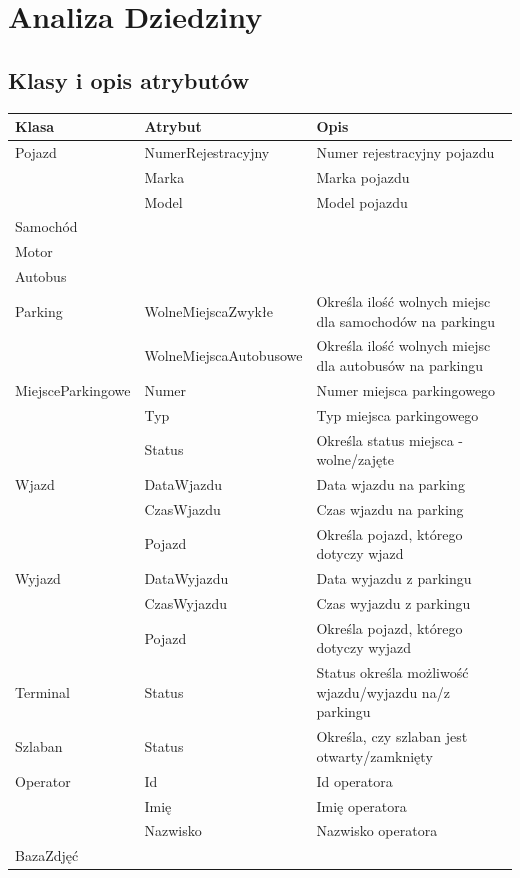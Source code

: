 \chapter{Analiza Dziedziny}
\label{cha:anDziedziny}

\section{Klasy i opis atrybutów}
\label{sec:klasyAtrybuty}
\begin{table}[H]
	\begin{tabular}{|l|l|l|} \hline
	\textbf{Klasa}	& \textbf{Atrybut} & \textbf{Opis} \\ \hline%
	Pojazd	& NumerRejestracyjny & Numer rejestracyjny pojazdu \\
	& Marka & Marka pojazdu \\
	& Model & Model pojazdu \\ \hline
	Samochód& & \\ \hline
	Motor& &  \\ \hline
	Autobus& & \\ \hline
	Parking	& WolneMiejscaZwykłe & Określa ilość wolnych miejsc dla samochodów na parkingu \\
	& WolneMiejscaAutobusowe & Określa ilość wolnych miejsc dla autobusów na parkingu \\ \hline
	MiejsceParkingowe	& Numer & Numer miejsca parkingowego \\
	& Typ & Typ miejsca parkingowego \\
	& Status & Określa status miejsca - wolne/zajęte \\ \hline
	Wjazd	& DataWjazdu & Data wjazdu na parking\\
	& CzasWjazdu & Czas wjazdu na parking \\
	& Pojazd & Określa pojazd, którego dotyczy wjazd \\ \hline
	Wyjazd	& DataWyjazdu & Data wyjazdu z parkingu\\
	& CzasWyjazdu & Czas wyjazdu z parkingu \\
	& Pojazd & Określa pojazd, którego dotyczy wyjazd \\ \hline
	Terminal & Status & Status określa możliwość wjazdu/wyjazdu na/z parkingu \\ \hline
	Szlaban & Status & Określa, czy szlaban jest otwarty/zamknięty\\ \hline
	Operator& Id & Id operatora \\
	& Imię & Imię operatora \\
	& Nazwisko & Nazwisko operatora \\ \hline
	BazaZdjęć& &  \\ \hline
	\end{tabular}
\end{table}


